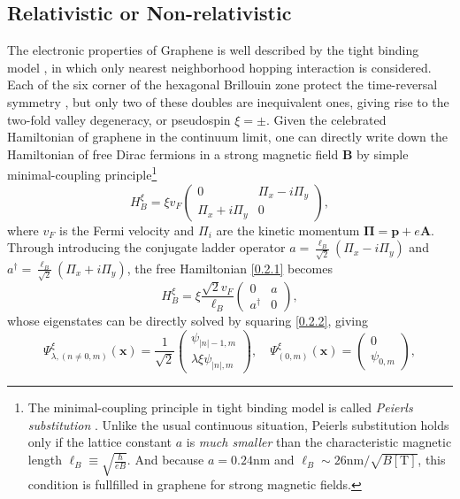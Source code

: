 \documentclass[bachelor,english,numbers]{ustcthesis}
\begin{document}
		\subsection{Relativistic or Non-relativistic}
			\indent\par The electronic properties of Graphene is well described by the tight binding model \cite{altland2010condensed}, in which only nearest neighborhood hopping interaction is considered. Each of the six corner of the hexagonal Brillouin zone protect the time-reversal symmetry \cite{fu2007topological}, but only two of these doubles are inequivalent ones, giving rise to the two-fold valley degeneracy, or pseudospin $\xi=\pm$. Given the celebrated Hamiltonian of graphene in the continuum limit, one can directly write down the Hamiltonian of free Dirac fermions in a strong magnetic field $\bm{B}$ by simple minimal-coupling principle\footnote{The minimal-coupling principle in tight binding model is called \emph{Peierls substitution} \cite{goerbig2011electronic}. Unlike the usual continuous situation, Peierls substitution holds only if the lattice constant $a$ is \emph{much smaller} than the characteristic magnetic length $\ell_B\equiv\sqrt{\frac{\hbar}{eB}}$. And because $a=0.24\mathrm{nm}$ and $\ell_B\sim26\mathrm{nm}/\sqrt{B[\mathrm{T}]}$, this condition is fullfilled in graphene for strong magnetic fields.} 
			\begin{equation}\label{0.2.1}
				H^\xi_B=\xi v_F\left(\begin{array}{cc}
					0 & \Pi_x-i\Pi_y\\
					\Pi_x+i\Pi_y & 0
				\end{array}\right),
			\end{equation}
			where $v_F$ is the Fermi velocity and $\Pi_i$ are the kinetic momentum $\bm{\Pi}=\bm{p}+e\bm{A}$. Through introducing the conjugate ladder operator $a=\frac{\ell_B}{\sqrt{2}}(\Pi_x-i\Pi_y)$ and $a^\dagger=\frac{\ell_B}{\sqrt{2}}(\Pi_x+i\Pi_y)$, the free Hamiltonian \eqref{0.2.1} becomes 
			\begin{equation}\label{0.2.2}
				H^\xi_B=\xi\dfrac{\sqrt{2}v_F}{\ell_B}\left(\begin{array}{cc}
					0 & a \\ a^\dagger & 0
				\end{array}\right),
			\end{equation}
			whose eigenstates can be directly solved by squaring \eqref{0.2.2}, giving \cite{tHoke2006fractional,tHoke20074}
			\begin{equation}\label{0.2.3}
				\Psi^\xi_{\lambda,(n\neq0,m)}(\bm{x})=\dfrac{1}{\sqrt{2}}\left(\begin{array}{c}
					\psi_{|n|-1,m}\\
					\lambda\xi\psi_{|n|,m}
				\end{array}\right),\quad\Psi^\xi_{(0,m)}(\bm{x})=\left(\begin{array}{c}
					0\\
					\psi_{0,m}
				\end{array}\right),
			\end{equation}
\end{document}
